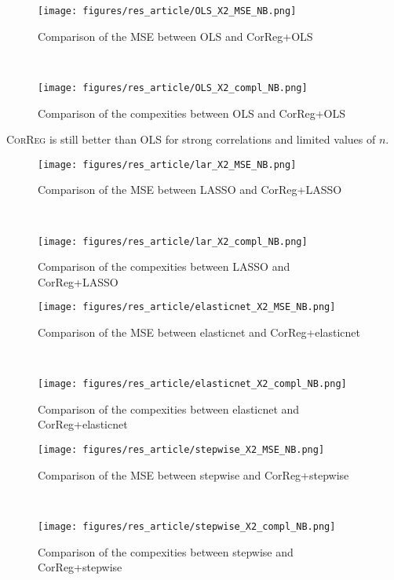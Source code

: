 \documentclass[12pt,a4paper]{report}
\begin{document}
 \begin{figure}[h!]
	\begin{minipage}[l]{.48\linewidth}
			\texttt{[image: figures/res\_article/OLS\_X2\_MSE\_NB.png]} 
			\caption{Comparison of the MSE between OLS and CorReg+OLS}
	\end{minipage} \
   \begin{minipage}[r]{.48\linewidth}
			\texttt{[image: figures/res\_article/OLS\_X2\_compl\_NB.png]} 
			\caption{Comparison of the compexities between OLS and CorReg+OLS} 
   \end{minipage}
\end{figure}
\textsc{CorReg} is still better than OLS for strong correlations and limited values of $n$. 
 \begin{figure}[h!]
	\begin{minipage}[l]{.48\linewidth}
			\texttt{[image: figures/res\_article/lar\_X2\_MSE\_NB.png]} 
			\caption{Comparison of the MSE between LASSO and CorReg+LASSO}
	\end{minipage} \
   \begin{minipage}[r]{.48\linewidth}
			\texttt{[image: figures/res\_article/lar\_X2\_compl\_NB.png]} 
			\caption{Comparison of the compexities between LASSO and CorReg+LASSO} 
   \end{minipage}
\end{figure}

 \begin{figure}[h!]
	\begin{minipage}[l]{.48\linewidth}
			\texttt{[image: figures/res\_article/elasticnet\_X2\_MSE\_NB.png]} 
			\caption{Comparison of the MSE between elasticnet and CorReg+elasticnet}
	\end{minipage} \
   \begin{minipage}[r]{.48\linewidth}
			\texttt{[image: figures/res\_article/elasticnet\_X2\_compl\_NB.png]} 
			\caption{Comparison of the compexities between elasticnet and CorReg+elasticnet} 
   \end{minipage}
\end{figure}

 \begin{figure}[h!]
	\begin{minipage}[l]{.48\linewidth}
			\texttt{[image: figures/res\_article/stepwise\_X2\_MSE\_NB.png]} 
			\caption{Comparison of the MSE between stepwise and CorReg+stepwise}
	\end{minipage} \
   \begin{minipage}[r]{.48\linewidth}
			\texttt{[image: figures/res\_article/stepwise\_X2\_compl\_NB.png]} 
			\caption{Comparison of the compexities between stepwise and CorReg+stepwise}
   \end{minipage}
\end{figure}
\end{document}
